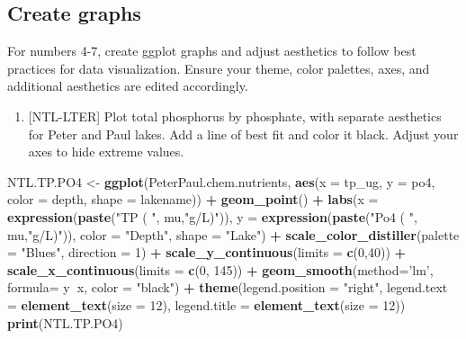 \documentclass[]{article}
\newenvironment{Shaded}{\begin{snugshade}}{\end{snugshade}}
\newcommand{\KeywordTok}[1]{\textcolor[rgb]{0.13,0.29,0.53}{\textbf{#1}}}
\newcommand{\DataTypeTok}[1]{\textcolor[rgb]{0.13,0.29,0.53}{#1}}
\newcommand{\DecValTok}[1]{\textcolor[rgb]{0.00,0.00,0.81}{#1}}
\newcommand{\StringTok}[1]{\textcolor[rgb]{0.31,0.60,0.02}{#1}}
\newcommand{\OperatorTok}[1]{\textcolor[rgb]{0.81,0.36,0.00}{\textbf{#1}}}
\newcommand{\NormalTok}[1]{#1}
\providecommand{\tightlist}{%
  \setlength{\itemsep}{0pt}\setlength{\parskip}{0pt}}
\begin{document}
\subsection{Create graphs}\label{create-graphs}

For numbers 4-7, create ggplot graphs and adjust aesthetics to follow
best practices for data visualization. Ensure your theme, color
palettes, axes, and additional aesthetics are edited accordingly.

\begin{enumerate}
\def\labelenumi{\arabic{enumi}.}
\setcounter{enumi}{3}
\tightlist
\item
  {[}NTL-LTER{]} Plot total phosphorus by phosphate, with separate
  aesthetics for Peter and Paul lakes. Add a line of best fit and color
  it black. Adjust your axes to hide extreme values.
\end{enumerate}

\begin{Shaded}
\begin{Highlighting}[]
\NormalTok{NTL.TP.PO4 <-}\StringTok{ }
\StringTok{  }\KeywordTok{ggplot}\NormalTok{(PeterPaul.chem.nutrients, }\KeywordTok{aes}\NormalTok{(}\DataTypeTok{x =}\NormalTok{ tp_ug, }\DataTypeTok{y =}\NormalTok{ po4, }\DataTypeTok{color =}\NormalTok{ depth, }\DataTypeTok{shape =}\NormalTok{ lakename)) }\OperatorTok{+}
\StringTok{  }\KeywordTok{geom_point}\NormalTok{() }\OperatorTok{+}
\StringTok{   }\KeywordTok{labs}\NormalTok{(}\DataTypeTok{x =} \KeywordTok{expression}\NormalTok{(}\KeywordTok{paste}\NormalTok{(}\StringTok{"TP ( "}\NormalTok{, mu,}\StringTok{"g/L)"}\NormalTok{)),}
       \DataTypeTok{y =} \KeywordTok{expression}\NormalTok{(}\KeywordTok{paste}\NormalTok{(}\StringTok{"Po4 ( "}\NormalTok{, mu,}\StringTok{"g/L)"}\NormalTok{)),}
      \DataTypeTok{color =} \StringTok{"Depth"}\NormalTok{, }\DataTypeTok{shape =} \StringTok{"Lake"}\NormalTok{) }\OperatorTok{+}
\StringTok{  }\KeywordTok{scale_color_distiller}\NormalTok{(}\DataTypeTok{palette =} \StringTok{"Blues"}\NormalTok{, }\DataTypeTok{direction =} \DecValTok{1}\NormalTok{) }\OperatorTok{+}
\StringTok{  }\KeywordTok{scale_y_continuous}\NormalTok{(}\DataTypeTok{limits =} \KeywordTok{c}\NormalTok{(}\DecValTok{0}\NormalTok{,}\DecValTok{40}\NormalTok{)) }\OperatorTok{+}
\StringTok{  }\KeywordTok{scale_x_continuous}\NormalTok{(}\DataTypeTok{limits =} \KeywordTok{c}\NormalTok{(}\DecValTok{0}\NormalTok{, }\DecValTok{145}\NormalTok{)) }\OperatorTok{+}
\StringTok{  }\KeywordTok{geom_smooth}\NormalTok{(}\DataTypeTok{method=}\StringTok{'lm'}\NormalTok{, }\DataTypeTok{formula=}\NormalTok{ y}\OperatorTok{~}\NormalTok{x, }\DataTypeTok{color =} \StringTok{"black"}\NormalTok{) }\OperatorTok{+}
\StringTok{  }\KeywordTok{theme}\NormalTok{(}\DataTypeTok{legend.position =} \StringTok{"right"}\NormalTok{, }
        \DataTypeTok{legend.text =} \KeywordTok{element_text}\NormalTok{(}\DataTypeTok{size =} \DecValTok{12}\NormalTok{), }\DataTypeTok{legend.title =} \KeywordTok{element_text}\NormalTok{(}\DataTypeTok{size =} \DecValTok{12}\NormalTok{))}
\KeywordTok{print}\NormalTok{(NTL.TP.PO4)  }
\end{Highlighting}
\end{Shaded}
\end{document}
